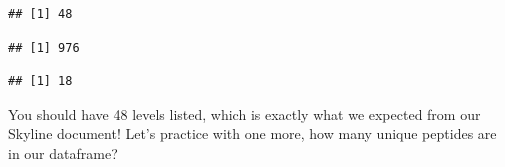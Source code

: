 \documentclass[]{book}
\newenvironment{Shaded}{\begin{snugshade}}{\end{snugshade}}
\newcommand{\DecValTok}[1]{\textcolor[rgb]{0.00,0.00,0.81}{#1}}
\newcommand{\KeywordTok}[1]{\textcolor[rgb]{0.13,0.29,0.53}{\textbf{#1}}}
\newcommand{\NormalTok}[1]{#1}
\newcommand{\OperatorTok}[1]{\textcolor[rgb]{0.81,0.36,0.00}{\textbf{#1}}}
\newcommand{\StringTok}[1]{\textcolor[rgb]{0.31,0.60,0.02}{#1}}
\begin{document}
\begin{Shaded}
\end{Shaded}

\begin{verbatim}
## [1] 48
\end{verbatim}

\begin{Shaded}
\end{Shaded}

\begin{verbatim}
## [1] 976
\end{verbatim}

\begin{Shaded}
\end{Shaded}

\begin{verbatim}
## [1] 18
\end{verbatim}

You should have 48 levels listed, which is exactly what we expected from our Skyline document! Let's practice with one more, how many unique peptides are in our dataframe?

\begin{Shaded}
\end{Shaded}
\end{document}
